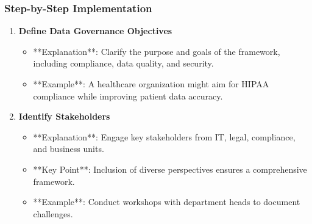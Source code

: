 \documentclass[aspectratio=169]{beamer}
\begin{document}
\begin{frame}[fragile]
    \frametitle{Step-by-Step Implementation}
    \begin{enumerate}
        \item \textbf{Define Data Governance Objectives}
            \begin{itemize}
                \item **Explanation**: Clarify the purpose and goals of the framework, including compliance, data quality, and security.
                \item **Example**: A healthcare organization might aim for HIPAA compliance while improving patient data accuracy.
            \end{itemize}
        
        \item \textbf{Identify Stakeholders}
            \begin{itemize}
                \item **Explanation**: Engage key stakeholders from IT, legal, compliance, and business units.
                \item **Key Point**: Inclusion of diverse perspectives ensures a comprehensive framework.
                \item **Example**: Conduct workshops with department heads to document challenges.
            \end{itemize}
    \end{enumerate}
\end{frame}
\end{document}
